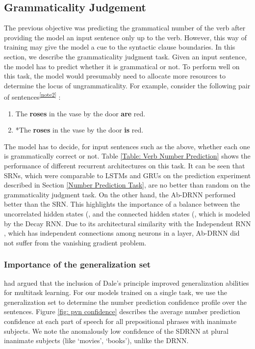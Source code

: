 \documentclass[11pt,a4paper]{article}
\begin{document}
\subsection{Grammaticality Judgement}
\label{subsec: Grammaticality}
The previous objective was predicting the grammatical number of the verb after providing the model an input sentence only up to the verb. However, this way of training may give the model a cue to the syntactic clause boundaries. In this section, we describe the grammaticality judgment task. Given an input sentence, the model has to predict whether it is grammatical or not. To perform well on this task, the model would presumably need to allocate more resources to determine the locus of ungrammaticality. For example, consider the following pair of sentences\textsuperscript{\ref{note2}} : 
\begin{enumerate}
    \item The \textbf{roses} in the vase by the door \textbf{are} red.
    \item *The \textbf{roses} in the vase by the door \textbf{is} red.
\end{enumerate}
The model has to decide, for input sentences such as the above, whether each one is grammatically correct or not. Table \ref{Table: Verb Number Prediction} shows the performance of different recurrent architectures on this task. It can be seen that SRNs, which were comparable to LSTMs and GRUs on the prediction experiment described in Section \ref{Number Prediction Task}, are no better than random on the grammaticality judgment task. On the other hand, the Ab-DRNN performed better than the SRN. This highlights the importance of a balance between the uncorrelated hidden states (, and the connected hidden states (, which is modeled by the Decay RNN. Due to its architectural similarity with the  Independent RNN \cite{li2018independently}, which has independent connections among neurons in a layer, Ab-DRNN did not suffer from the vanishing gradient problem. 




\subsubsection*{Importance of the generalization set}
\citet{capano2015optimal} had argued that the inclusion of Dale's principle improved generalization abilities for multitask learning. For our models trained on a single task, we use the generalization set to determine the number prediction confidence profile over the sentences. Figure \ref{fig: pvn confidence} describes the average number prediction confidence at each part of speech for all prepositional phrases with inanimate subjects. We note the anomalously low confidence of the SDRNN at plural inanimate subjects (like `movies', `books'), unlike the DRNN.
\end{document}
